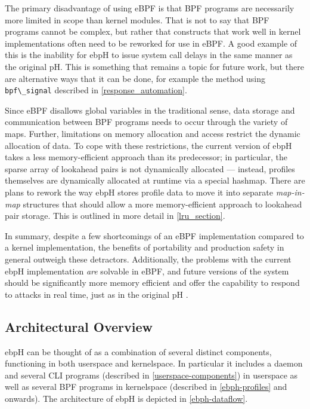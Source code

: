 \documentclass[
  12pt]{findlay}
\newcommand{\passthrough}[1]{#1}
\begin{document}
The primary disadvantage of using eBPF is that BPF programs are
necessarily more limited in scope than kernel modules. That is not to
say that BPF programs cannot be complex, but rather that constructs that
work well in kernel implementations often need to be reworked for use in
eBPF. A good example of this is the inability for ebpH to issue system
call delays in the same manner as the original pH. This is something
that remains a topic for future work, but there are alternative ways
that it can be done, for example the method using
\passthrough{\lstinline!bpf\_signal!} described in
\autoref{response_automation}.

Since eBPF disallows global variables in the traditional sense, data
storage and communication between BPF programs needs to occur through
the variety of maps. Further, limitations on memory allocation and
access restrict the dynamic allocation of data. To cope with these
restrictions, the current version of ebpH takes a less memory-efficient
approach than its predecessor; in particular, the sparse array of
lookahead pairs is not dynamically allocated --- instead, profiles
themselves are dynamically allocated at runtime via a special hashmap.
There are plans to rework the way ebpH stores profile data to move it
into separate \emph{map-in-map} structures that should allow a more
memory-efficient approach to lookahead pair storage. This is outlined in
more detail in \autoref{lru_section}.

In summary, despite a few shortcomings of an eBPF implementation
compared to a kernel implementation, the benefits of portability and
production safety in general outweigh these detractors. Additionally,
the problems with the current ebpH implementation \emph{are} solvable in
eBPF, and future versions of the system should be significantly more
memory efficient and offer the capability to respond to attacks in real
time, just as in the original pH \autocite{soma02}.

\hypertarget{architectural-overview}{%
\subsection{Architectural Overview}\label{architectural-overview}}

ebpH can be thought of as a combination of several distinct components,
functioning in both userspace and kernelspace. In particular it includes
a daemon and several CLI programs (described in
\autoref{userspace-components}) in userspace as well as several BPF
programs in kernelspace (described in \autoref{ebph-profiles} and
onwards). The architecture of ebpH is depicted in
\autoref{ebph-dataflow}.
\end{document}
